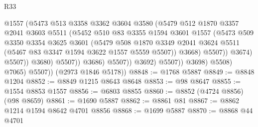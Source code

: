 \begin{lexlean}{R33}
\begin{coremodule}
                                      @1557
                                      (@5473
                                        @513
                                        @3358
                                        @3362
                                        @3604
                                        @3580
                                        (@5479
                                          @512
                                          @1870
                                          @3357
                                          @2041
                                          @3603
                                          @5511
                                          (@5452
                                            @510
                                            @83
                                            @3355
                                            @1594
                                            @3601
                                            @1557
                                            (@5473
                                              @509
                                              @3350
                                              @3354
                                              @3625
                                              @3601
                                              (@5479
                                                @508
                                                @1870
                                                @3349
                                                @2041
                                                @3624
                                                @5511
                                                (@5467 @83 @3347 @1594 @3622 @1557 @5559 @5507))
                                              @3668)
                                            @5507))
                                        @3674)
                                      @5507))
                                  @3680)
                                @5507))
                            @3686)
                          @5507))
                      @3692)
                    @5507))
                @3698)
              @5508)
            @7065)
          @5507))
      (@2973 @1846 @5178))
@8848 := @1768 @5887
@8849 := @8848 @1204
@8852 := @8849 @1215 @8643 @8648
@8853 := @98 @8647
@8855 := @1554 @8853 @1557
@8856 := @6803 @8855
@8860 := @8852 (@4724 @8856) (@98 @8659)
@8861 := @1690 @5887
@8862 := @8861 @81
@8867 := @8862 @1214 @1594 @8642 @4701 @8856
@8868 := @1699 @5887
@8870 := @8868 @44 @4701

\end{coremodule}
\end{lexlean}
